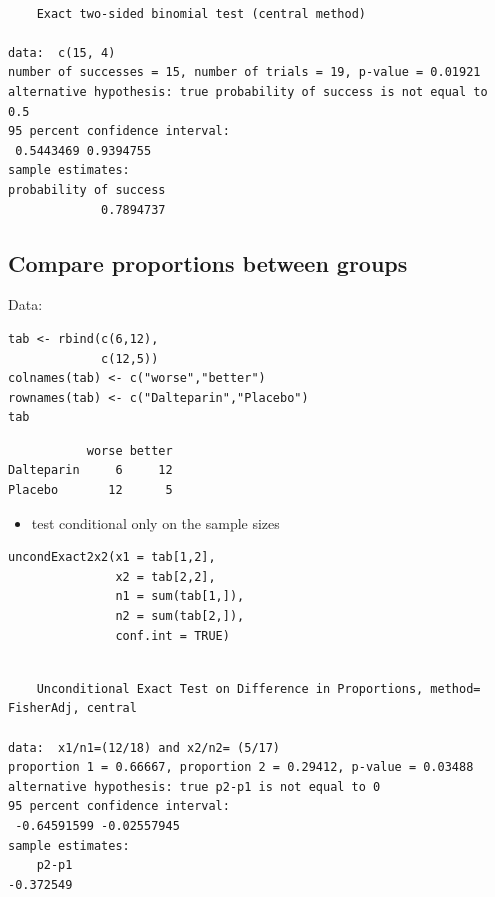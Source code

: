 \documentclass{article}
\begin{document}
\begin{verbatim}

	Exact two-sided binomial test (central method)

data:  c(15, 4)
number of successes = 15, number of trials = 19, p-value = 0.01921
alternative hypothesis: true probability of success is not equal to 0.5
95 percent confidence interval:
 0.5443469 0.9394755
sample estimates:
probability of success 
             0.7894737
\end{verbatim}

\subsection{Compare proportions between groups}
\label{sec:orge5781a2}

Data:
\lstset{language=r,label= ,caption= ,captionpos=b,numbers=none}
\begin{lstlisting}
tab <- rbind(c(6,12),
             c(12,5))
colnames(tab) <- c("worse","better")
rownames(tab) <- c("Dalteparin","Placebo")
tab
\end{lstlisting}

\begin{verbatim}
           worse better
Dalteparin     6     12
Placebo       12      5
\end{verbatim}


\bigskip

\begin{itemize}
\item test conditional only on the sample sizes
\end{itemize}
\lstset{language=r,label= ,caption= ,captionpos=b,numbers=none}
\begin{lstlisting}
uncondExact2x2(x1 = tab[1,2],
               x2 = tab[2,2],
               n1 = sum(tab[1,]),
               n2 = sum(tab[2,]),
               conf.int = TRUE)
\end{lstlisting}

\begin{verbatim}

	Unconditional Exact Test on Difference in Proportions, method= FisherAdj, central

data:  x1/n1=(12/18) and x2/n2= (5/17)
proportion 1 = 0.66667, proportion 2 = 0.29412, p-value = 0.03488
alternative hypothesis: true p2-p1 is not equal to 0
95 percent confidence interval:
 -0.64591599 -0.02557945
sample estimates:
    p2-p1 
-0.372549
\end{verbatim}
\end{document}
